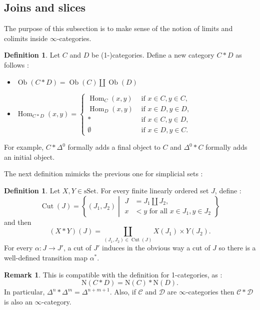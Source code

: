 \documentclass[11pt]{article}
\theoremstyle{definition}
\newtheorem{definition}[theorem]{Definition}
\newtheorem{remark}[theorem]{Remark}
\newcommand{\C}{\mathcal{C}}
\newcommand{\Cut}{\operatorname{Cut}}
\newcommand{\D}{\mathcal{D}}
\newcommand{\Hom}{\operatorname{Hom}}
\newcommand{\N}{\mathrm{N}}
\newcommand{\Ob}{\operatorname{Ob}}
\newcommand{\sSet}{\mathrm{sSet}}
\begin{document}
\subsection{Joins and slices}

The purpose of this subsection is to make sense of the notion of limits and colimits inside $\infty$-categories.

\begin{definition}
    Let $C$ and $D$ be (1-)categories. Define a new category $C \ast D$ as follows :
    \begin{itemize}
        \item $\Ob(C \ast D) = \Ob(C) \amalg \Ob(D)$
        \item $\Hom_{C \ast D}(x, y) = \left\{\begin{aligned}
            \Hom_C(x, y) &\text{ if }x \in C, y \in C,\\
            \Hom_D(x, y) &\text{ if }x \in D, y \in D,\\
            \ast &\text{ if }x \in C, y \in D,\\
            \emptyset &\text{ if }x \in D, y \in C.
        \end{aligned}\right.$
    \end{itemize}
\end{definition}
For example, $C \ast \Delta^0$ formally adds a final object to $C$ and $\Delta^0 \ast C$ formally adds an initial object.

The next definition mimicks the previous one for simplicial sets :
\begin{definition}
    Let $X, Y \in \sSet$. For every finite linearly ordered set $J$, define :
    \[
        \Cut(J) = \left\{(J_1, J_2) \middle| \begin{aligned}J &= J_1 \amalg J_2,\\x &< y \text{ for all }x \in J_1, y \in J_2\end{aligned}\right\}
    \]
    and then
    \[
        (X \ast Y)(J) = \coprod_{(J_1, J_2) \in \Cut(J)} X(J_1) \times Y(J_2).
    \]
    For every $\alpha : J \to J'$, a cut of $J'$ induces in the obvious way a cut of $J$ so there is a well-defined transition map $\alpha^*$.
\end{definition}

\begin{remark}
    This is compatible with the definition for 1-categories, as :
    \[
        \N(C \ast D) = \N(C) \ast \N(D).
    \]
    In particular, $\Delta^n \ast \Delta^m = \Delta^{n+m+1}$.
    Also, if $\C$ and $\D$ are $\infty$-categories then $\C \ast \D$ is also an $\infty$-category.
\end{remark}
\end{document}
